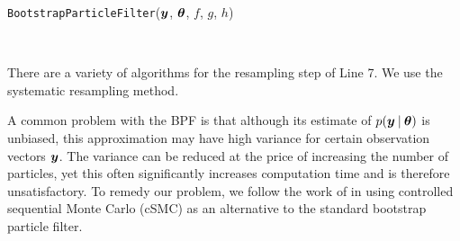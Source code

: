 \documentclass[twoside]{article}
\begin{document}
\begin{algorithm}
\caption{\texttt{BootstrapParticleFilter}($\boldsymbol{y}$, $\boldsymbol{\theta}$, $f$, $g$, $h$)} \label{bpf}
  \begin{algorithmic}[1]
    \EndFor
   	 \EndFor
    \EndFor \\
   \end{algorithmic}
\end{algorithm}

There are a variety of algorithms for the resampling step of Line 7.  We use the systematic resampling method.

\noindent A common problem with the BPF is that although its estimate of $p(\boldsymbol{y} \:\vert\: \boldsymbol{\theta})$ is unbiased, this approximation may have high variance for certain observation vectors $\boldsymbol{y}$.  The variance can be reduced at the price of increasing the number of particles, yet this often significantly increases computation time and is therefore unsatisfactory.  To remedy our problem, we follow the work of \cite{heng2017controlled} in using controlled sequential Monte Carlo (cSMC) as an alternative to the standard bootstrap particle filter. 
\end{document}
